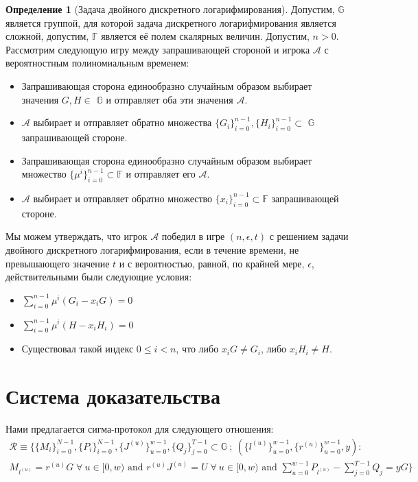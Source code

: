 \documentclass{article}
\newcommand{\F}{\mathbb{F}}
\newcommand{\A}{\mathcal{A}}
\newcommand{\sumi}{\sum_{i=0}^{n-1}}
\theoremstyle{definition}
\newtheorem{definition}{Определение}
\begin{document}
\begin{definition}[Задача двойного дискретного логарифмирования]
\label{def:dual}
Допустим, \begin{math}\mathbb{G}\end{math} является группой, для которой задача дискретного логарифмирования является сложной, допустим, $\F$ является её полем скалярных величин.
Допустим, $n > 0$.
Рассмотрим следующую игру между запрашивающей стороной и игрока $\A$ с вероятностным полиномиальным временем:
\begin{itemize}
\item Запрашивающая сторона единообразно случайным образом выбирает значения $G,H \in$ \begin{math}\mathbb{G}\end{math} и отправляет оба эти значения $\A$.
\item $\A$ выбирает и отправляет обратно множества $\{G_i\}_{i=0}^{n-1},\{H_i\}_{i=0}^{n-1} \subset$ \begin{math}\mathbb{G}\end{math} запрашивающей стороне.
\item Запрашивающая сторона единообразно случайным образом выбирает множество $\{\mu^i\}_{i=0}^{n-1} \subset \F$ и отправляет его $\A$.
\item $\A$ выбирает и отправляет обратно множество $\{x_i\}_{i=0}^{n-1} \subset \F$ запрашивающей стороне.
\end{itemize}
Мы можем утверждать, что игрок $\A$ победил в игре $(n,\epsilon,t)$ с решением задачи двойного дискретного логарифмирования, если в течение времени, не превышающего значение $t$ и с вероятностью, равной, по крайней мере, $\epsilon$, действительными были следующие условия:
\begin{itemize}
\item $\sumi \mu^i \left( G_i - x_iG \right) = 0$
\item $\sumi \mu^i \left( H - x_iH_i \right) = 0$
\item Существовал такой индекс $0 \leq i < n$, что либо $x_iG \neq G_i$, либо $x_iH_i \neq H$.
\end{itemize}
\end{definition}


\section{Система доказательства}
Нами предлагается сигма-протокол для следующего отношения:
\begin{multline*}
\mathcal{R} \equiv \Bigg\{ \{M_i\}_{i=0}^{N-1},\{P_i\}_{i=0}^{N-1},\{J^{(u)}\}_{u=0}^{w-1},\{Q_j\}_{j=0}^{T-1} \subset \mathbb{G} \: ; \: \left( \{l^{(u)}\}_{u=0}^{w-1}, \{r^{(u)}\}_{u=0}^{w-1}, y \right) : \\
M_{l^{(u)}} = r^{(u)}G \; \forall \: u \in [0,w) \text{ and } r^{(u)}J^{(u)} = U \; \forall \: u \in [0,w) \text{ and } \sum_{u=0}^{w-1} P_{l^{(u)}} - \sum_{j=0}^{T-1} Q_j = yG \Bigg\}
\end{multline*}
\end{document}
